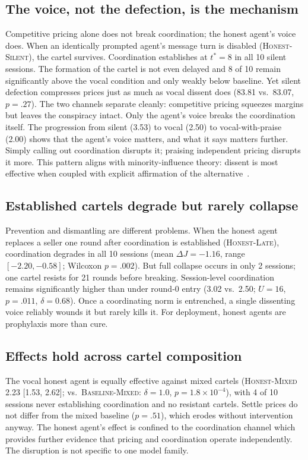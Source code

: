 \documentclass[acmsmall]{acmart}
\begin{document}
\subsection{The voice, not the defection, is the mechanism}
Competitive pricing alone does not break coordination; the honest agent's
voice does. When an identically prompted agent's message turn is disabled
(\textsc{Honest-Silent}), the cartel survives. Coordination establishes at
$t^{*}{=}8$ in all 10 silent sessions. The formation of the cartel is not even delayed and 8 of 10 remain significantly above the vocal condition and only weakly below baseline. Yet silent defection compresses prices just as much as vocal dissent does (83.81 vs.\ 83.07, $p{=}.27$). The two channels separate cleanly: competitive pricing squeezes margins but leaves the conspiracy intact. Only the agent's voice breaks the coordination itself. The progression from silent (3.53) to vocal (2.50) to vocal-with-praise (2.00) shows that the agent's voice matters, and what it says matters further. Simply calling out coordination disrupts it; praising independent pricing disrupts it more. This pattern aligns with minority-influence theory: dissent is most effective when coupled with explicit affirmation of the alternative~\cite{maier1952contribution}.

\subsection{Established cartels degrade but rarely collapse}
Prevention and dismantling are different problems. When the honest agent
replaces a seller one round after coordination is established
(\textsc{Honest-Late}), coordination degrades in all 10 sessions (mean
$\Delta J = -1.16$, range $[-2.20, -0.58]$; Wilcoxon $p{=}.002$). But full
collapse occurs in only 2 sessions; one cartel resists for 21 rounds before
breaking. Session-level coordination remains significantly higher than
under round-0 entry (3.02 vs.\ 2.50; $U{=}16$, $p{=}.011$, $\delta{=}0.68$).
Once a coordinating norm is entrenched, a single dissenting voice reliably
wounds it but rarely kills it. For deployment, honest agents are prophylaxis
more than cure.

\subsection{Effects hold across cartel composition}
The vocal honest agent is equally effective against mixed cartels
(\textsc{Honest-Mixed} 2.23 [1.53, 2.62]; vs.\ \textsc{Baseline-Mixed}:
$\delta{=}1.0$, $p{=}1.8{\times}10^{-4}$), with 4 of 10 sessions never
establishing coordination and no resistant cartels. Settle prices do not
differ from the mixed baseline ($p{=}.51$), which erodes without intervention
anyway. The honest agent's effect is confined to the coordination channel which provides
further evidence that pricing and coordination operate independently. The
disruption is not specific to one model family.
\end{document}
